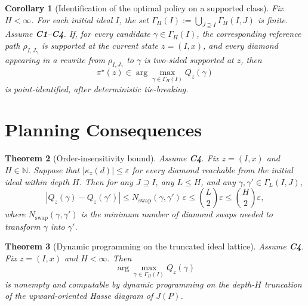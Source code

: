 \documentclass{article}
\newtheorem{theorem}{Theorem}[section]
\newtheorem{corollary}[theorem]{Corollary}
\theoremstyle{definition}
\begin{document}
\begin{corollary}[Identification of the optimal policy on a supported class]
\label{cor:policy-main}
Fix \(H<\infty\). For each initial ideal \(I\), the set
$
\textstyle \Gamma_H(I):=\bigcup_{J\supseteq I} \Gamma_H(I,J)
$
is finite. Assume \textbf{C1}--\textbf{C4}. If, for every candidate \(\gamma\in \Gamma_H(I)\), the corresponding reference path \(\rho_{I,J_\gamma}\) is supported at the current state \(z=(I,x)\), and every diamond appearing in a rewrite from \(\rho_{I,J_\gamma}\) to \(\gamma\) is two-sided supported at \(z\), then
\begin{equation}
\textstyle \pi^\star(z)\in \arg\max_{\gamma\in \Gamma_H(I)} Q_z(\gamma)
\label{eq:identified-optimal-policy}
\end{equation}
is point-identified, after deterministic tie-breaking.
\end{corollary}

\section{Planning Consequences}
\label{sec:planning}

\begin{theorem}[Order-insensitivity bound]
\label{thm:order-bound-main}
Assume \textbf{C4}. Fix \(z=(I,x)\) and \(H\in\mathbb N\). Suppose that
$
|\kappa_z(d)|\le \varepsilon
$
for every diamond reachable from the initial ideal within depth \(H\). Then for any \(J\supseteq I\), any \(L\le H\), and any \(\gamma,\gamma'\in \Gamma_L(I,J)\),
\begin{equation}
\textstyle |Q_z(\gamma)-Q_z(\gamma')|
\le
N_{\mathrm{swap}}(\gamma,\gamma')\,\varepsilon
\le
\binom{L}{2}\varepsilon
\le
\binom{H}{2}\varepsilon,
\label{eq:order-insensitivity-bound}
\end{equation}
where \(N_{\mathrm{swap}}(\gamma,\gamma')\) is the minimum number of diamond swaps needed to transform \(\gamma\) into \(\gamma'\).
\end{theorem}

\begin{theorem}[Dynamic programming on the truncated ideal lattice]
\label{thm:dp-main}
Assume \textbf{C4}. Fix \(z=(I,x)\) and \(H<\infty\). Then
\begin{equation}
\textstyle \arg\max_{\gamma\in \Gamma_H(I)} Q_z(\gamma)
\label{eq:dp-target}
\end{equation}
is nonempty and computable by dynamic programming on the depth-\(H\) truncation of the upward-oriented Hasse diagram of \(J(P)\).
\end{theorem}
\end{document}
